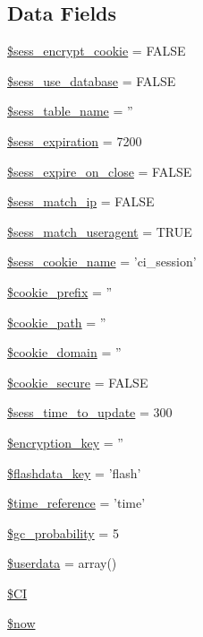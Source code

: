 \subsection*{Data Fields}
\begin{DoxyCompactItemize}
\item 
\hyperlink{class_c_i___session_a6d32af5e9bd9b9105ae0820ed8a09495}{\$sess\-\_\-encrypt\-\_\-cookie} = F\-A\-L\-S\-E
\item 
\hyperlink{class_c_i___session_a98c035e4010a1f494b146d950d7f41a3}{\$sess\-\_\-use\-\_\-database} = F\-A\-L\-S\-E
\item 
\hyperlink{class_c_i___session_ac02cd771521df3c8c52675a63097cf8f}{\$sess\-\_\-table\-\_\-name} = ''
\item 
\hyperlink{class_c_i___session_a3ef0fc3196a5fc8415939b69d158a488}{\$sess\-\_\-expiration} = 7200
\item 
\hyperlink{class_c_i___session_abd220b00e9d36c1e3296f9ddef681f01}{\$sess\-\_\-expire\-\_\-on\-\_\-close} = F\-A\-L\-S\-E
\item 
\hyperlink{class_c_i___session_ac87480ccf2a450d6ef69dead9c7b01bb}{\$sess\-\_\-match\-\_\-ip} = F\-A\-L\-S\-E
\item 
\hyperlink{class_c_i___session_a2026f3075cd8256329189662923c1f34}{\$sess\-\_\-match\-\_\-useragent} = T\-R\-U\-E
\item 
\hyperlink{class_c_i___session_a7e2872972d8eef9294738fd18e054fbb}{\$sess\-\_\-cookie\-\_\-name} = 'ci\-\_\-session'
\item 
\hyperlink{class_c_i___session_ada115919bde6b8248b4326b5fbd8a618}{\$cookie\-\_\-prefix} = ''
\item 
\hyperlink{class_c_i___session_a306f5cca27534399088154892069210c}{\$cookie\-\_\-path} = ''
\item 
\hyperlink{class_c_i___session_abec6ae06ad5526172520fb1ccb7c6806}{\$cookie\-\_\-domain} = ''
\item 
\hyperlink{class_c_i___session_a34b1dc25271af52f269a649392ce8d43}{\$cookie\-\_\-secure} = F\-A\-L\-S\-E
\item 
\hyperlink{class_c_i___session_aa1487c597a0e2b1d804802a75878dd8f}{\$sess\-\_\-time\-\_\-to\-\_\-update} = 300
\item 
\hyperlink{class_c_i___session_a35bbf76a5bcca90ca9b39368ed28121c}{\$encryption\-\_\-key} = ''
\item 
\hyperlink{class_c_i___session_afaa74f7303193b2ca2452540c3fd45ff}{\$flashdata\-\_\-key} = 'flash'
\item 
\hyperlink{class_c_i___session_ae76ac08d6f71ee519ff2f723489edbad}{\$time\-\_\-reference} = 'time'
\item 
\hyperlink{class_c_i___session_a96b09cc763572f45280786a7b33feb7e}{\$gc\-\_\-probability} = 5
\item 
\hyperlink{class_c_i___session_af70e594e86a310311c717b13e6ecac00}{\$userdata} = array()
\item 
\hyperlink{class_c_i___session_ae0314d046ddf7fcfaec03222977427d3}{\$\-C\-I}
\item 
\hyperlink{class_c_i___session_af1d5ccdee975b8f4d20aaffc5b28557c}{\$now}
\end{DoxyCompactItemize}


